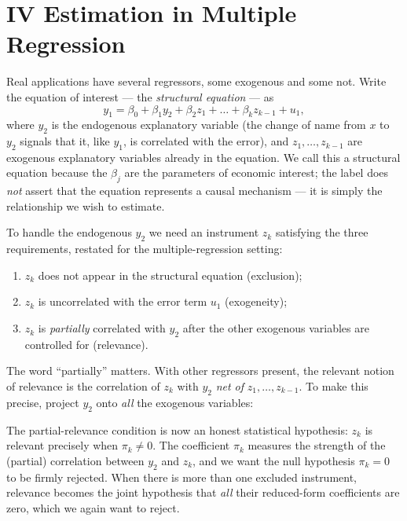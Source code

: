 \section{IV Estimation in Multiple Regression}
\label{sec:iv-mlr}

Real applications have several regressors, some exogenous and some not. Write the equation of interest --- the \emph{structural equation} --- as
\[
y_1 = \beta_0 + \beta_1 y_2 + \beta_2 z_1 + \dots + \beta_k z_{k-1} + u_1,
\]
where $y_2$ is the endogenous explanatory variable (the change of name from $x$ to $y_2$ signals that it, like $y_1$, is correlated with the error), and $z_1,\dots,z_{k-1}$ are exogenous explanatory variables already in the equation. We call this a structural equation because the $\beta_j$ are the parameters of economic interest; the label does \emph{not} assert that the equation represents a causal mechanism --- it is simply the relationship we wish to estimate.

To handle the endogenous $y_2$ we need an instrument $z_k$ satisfying the three requirements, restated for the multiple-regression setting:
\begin{enumerate}
    \item $z_k$ does not appear in the structural equation (exclusion);
    \item $z_k$ is uncorrelated with the error term $u_1$ (exogeneity);
    \item $z_k$ is \emph{partially} correlated with $y_2$ after the other exogenous variables are controlled for (relevance).
\end{enumerate}
The word ``partially'' matters. With other regressors present, the relevant notion of relevance is the correlation of $z_k$ with $y_2$ \emph{net of} $z_1,\dots,z_{k-1}$. To make this precise, project $y_2$ onto \emph{all} the exogenous variables:


The partial-relevance condition is now an honest statistical hypothesis: $z_k$ is relevant precisely when $\pi_k\neq 0$. The coefficient $\pi_k$ measures the strength of the (partial) correlation between $y_2$ and $z_k$, and we want the null hypothesis $\pi_k=0$ to be firmly rejected. When there is more than one excluded instrument, relevance becomes the joint hypothesis that \emph{all} their reduced-form coefficients are zero, which we again want to reject.

